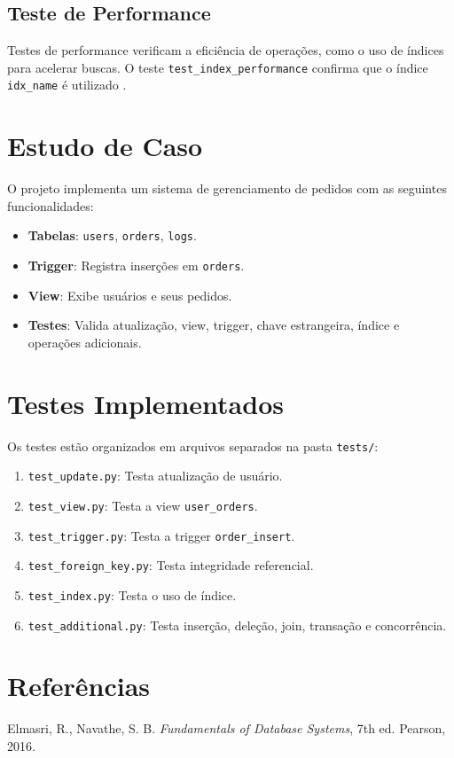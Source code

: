 \documentclass[a4paper,12pt]{article}
\begin{document}
\subsection{Teste de Performance}
Testes de performance verificam a eficiência de operações, como o uso de índices para acelerar buscas. O teste \texttt{test\_index\_performance} confirma que o índice \texttt{idx\_name} é utilizado \cite{elm}.

\section{Estudo de Caso}
O projeto implementa um sistema de gerenciamento de pedidos com as seguintes funcionalidades:
\begin{itemize}
    \item \textbf{Tabelas}: \texttt{users}, \texttt{orders}, \texttt{logs}.
    \item \textbf{Trigger}: Registra inserções em \texttt{orders}.
    \item \textbf{View}: Exibe usuários e seus pedidos.
    \item \textbf{Testes}: Valida atualização, view, trigger, chave estrangeira, índice e operações adicionais.
\end{itemize}

\section{Testes Implementados}
Os testes estão organizados em arquivos separados na pasta \texttt{tests/}:
\begin{enumerate}
    \item \texttt{test\_update.py}: Testa atualização de usuário.
    \item \texttt{test\_view.py}: Testa a view \texttt{user\_orders}.
    \item \texttt{test\_trigger.py}: Testa a trigger \texttt{order\_insert}.
    \item \texttt{test\_foreign\_key.py}: Testa integridade referencial.
    \item \texttt{test\_index.py}: Testa o uso de índice.
    \item \texttt{test\_additional.py}: Testa inserção, deleção, join, transação e concorrência.
\end{enumerate}

\section{Referências}
\begin{thebibliography}{9}
Elmasri, R., Navathe, S. B. \emph{Fundamentals of Database Systems}, 7th ed. Pearson, 2016.
\end{thebibliography}
\end{document}
